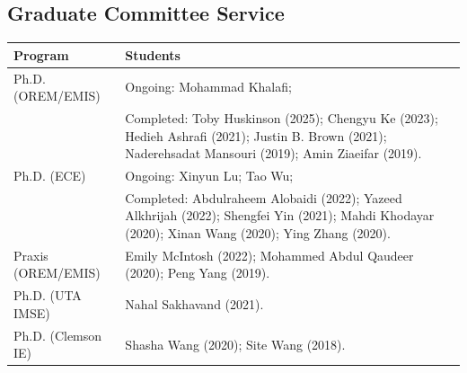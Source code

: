 \documentclass[hyperref, margin]{myResume}
\begin{document}
\begin{resume}
\section{Graduate Committee Service}
	\vspace*{0.5cm}
	\begin{longtable}{p{} p{}}
			\hline
			Program & Students \\ 
			\hline
			Ph.D. (OREM/EMIS) 	& Ongoing: Mohammad Khalafi; \\[3pt]
								& Completed: Toby Huskinson (2025); Chengyu Ke (2023); Hedieh Ashrafi (2021); Justin B. Brown (2021); Naderehsadat Mansouri (2019); Amin Ziaeifar (2019). \\[3pt] \hline
			Ph.D. (ECE)  		& Ongoing: Xinyun Lu; Tao Wu; \\ [3pt]
								& Completed: Abdulraheem Alobaidi (2022); Yazeed Alkhrijah (2022); Shengfei Yin (2021); Mahdi Khodayar (2020); Xinan Wang (2020); Ying Zhang (2020). \\ [3pt]\hline
			Praxis (OREM/EMIS)	& Emily McIntosh (2022); Mohammed Abdul Qaudeer (2020); Peng Yang (2019). \\ [3pt]\hline
			Ph.D. (UTA IMSE)	& Nahal Sakhavand (2021). \\ [3pt] \hline
			Ph.D. (Clemson IE)	& Shasha Wang (2020); Site Wang (2018). \\ [3pt]\hline
	\end{longtable}
	

\end{resume}
\end{document}
